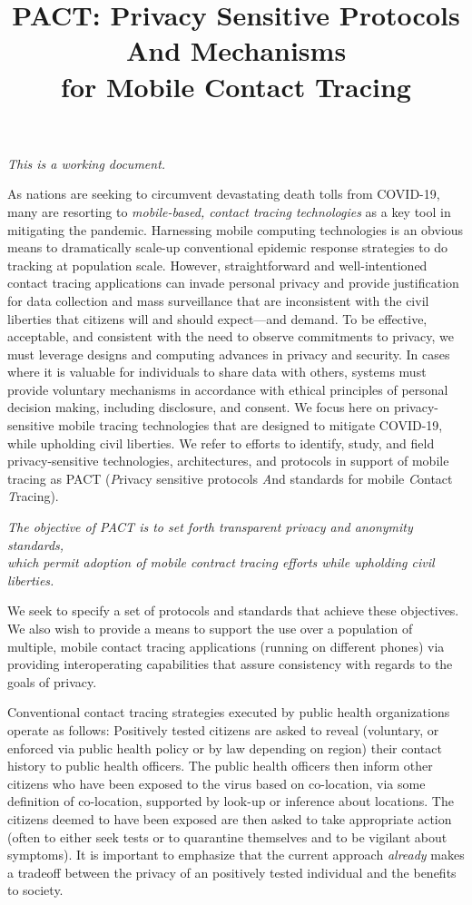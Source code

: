 \documentclass{article}
\title{{\Huge PACT\/}:   {\Huge P\/}rivacy Sensitive Protocols {\Huge A\/}nd Mechanisms
\\for Mobile {\Huge C\/}ontact {\Huge T\/}racing }
\date{}
\begin{document}
\maketitle

\emph{This is a working document.}

As nations are seeking to circumvent devastating death tolls from COVID-19, many are resorting to \emph{mobile-based, contact tracing technologies} as a key tool in mitigating the pandemic. Harnessing mobile computing technologies is an obvious means to dramatically scale-up conventional epidemic response strategies to do tracking at population scale. However, straightforward and well-intentioned contact tracing applications can invade personal privacy and provide justification for data collection and mass surveillance that are inconsistent with the civil liberties that citizens will and should expect---and demand. To be effective, acceptable, and consistent with the need to observe commitments to  privacy, we must leverage designs and computing advances in privacy and security. In cases where it is valuable for individuals to share data with others, systems must provide voluntary mechanisms in accordance with ethical principles of personal decision making, including disclosure, and consent. We focus here on privacy-sensitive mobile tracing technologies that are designed to mitigate COVID-19, while upholding civil liberties. We refer to efforts to identify, study, and field  privacy-sensitive technologies, architectures, and protocols in support of mobile tracing as PACT (\emph{P}rivacy sensitive protocols \emph{A}nd standards for mobile \emph{C}ontact \emph{T}racing).

\begin{center}
\emph{The objective of PACT is to set forth transparent privacy and
  anonymity standards,\\
  which permit adoption of mobile contract tracing efforts while upholding civil liberties.}
\end{center}

We seek to specify a set of protocols and standards that achieve
these objectives. We also wish to provide a means to support the use over a population of multiple, mobile contact tracing applications (running on different phones) via providing interoperating capabilities that assure consistency with regards to the goals of privacy. 

Conventional contact tracing strategies executed by public health organizations operate as follows: Positively tested citizens are asked to reveal (voluntary, or enforced via public health policy or by law depending on region) their contact history to public health officers. The public health officers then inform other citizens who have been exposed to the virus based on co-location, via some definition of co-location, supported by look-up or inference about locations. The citizens deemed to have been exposed are then asked to take appropriate action (often to either seek tests or to quarantine
themselves and to be vigilant about symptoms).  It is important to emphasize that the current approach \emph{already} makes a tradeoff between the privacy of an positively tested individual and the benefits to society.
\end{document}

